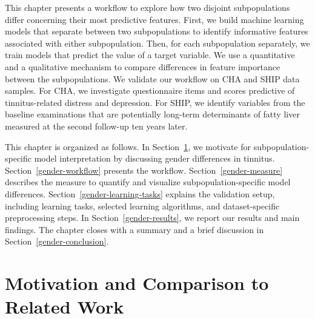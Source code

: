 \documentclass[
  oneside]{book}
\begin{document}
This chapter presents a workflow to explore how two disjoint subpopulations differ concerning their most predictive features.
First, we build machine learning models that separate between two subpopulations to identify informative features associated with either subpopulation.
Then, for each subpopulation separately, we train models that predict the value of a target variable.
We use a quantitative and a qualitative mechanism to compare differences in feature importance between the subpopulations.
We validate our workflow on CHA and SHIP data samples.
For CHA, we investigate questionnaire items and scores predictive of tinnitus-related distress and depression.
For SHIP, we identify variables from the baseline examinations that are potentially long-term determinants of fatty liver measured at the second follow-up ten years later.

This chapter is organized as follows.
In Section~\ref{gender-intro}, we motivate for subpopulation-specific model interpretation by discussing gender differences in tinnitus.
Section~\ref{gender-workflow} presents the workflow.
Section~\ref{gender-measure} describes the measure to quantify and visualize subpopulation-specific model differences.
Section~\ref{gender-learning-tasks} explains the validation setup, including learning tasks, selected learning algorithms, and dataset-specific preprocessing steps.
In Section~\ref{gender-results}, we report our results and main findings.
The chapter closes with a summary and a brief discussion in Section~\ref{gender-conclusion}.

\hypertarget{gender-intro}{%
\section{Motivation and Comparison to Related Work}\label{gender-intro}}
\end{document}
